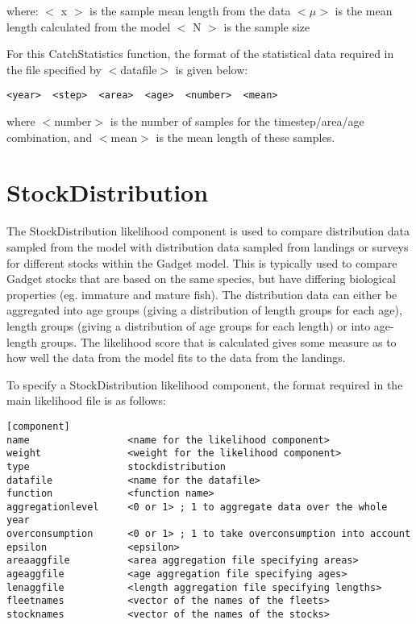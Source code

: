 \documentclass[10pt,twoside]{book}
\begin{document}
where:\newline
$<$ x $>$ is the sample mean length from the data\newline
$<\mu>$ is the mean length calculated from the model\newline
$<$ N $>$ is the sample size

\bigskip
For this CatchStatistics function, the format of the statistical data required in the file specified by $<$datafile$>$ is given below:

{\small\begin{verbatim}
<year>  <step>  <area>  <age>  <number>  <mean>
\end{verbatim}}

where $<$number$>$ is the number of samples for the timestep/area/age combination, and $<$mean$>$ is the mean length of these samples.

\section{StockDistribution}\label{sec:stockdist}
The StockDistribution likelihood component is used to compare distribution data sampled from the model with distribution data sampled from landings or surveys for different stocks within the Gadget model.  This is typically used to compare Gadget stocks that are based on the same species, but have differing biological properties (eg. immature and mature fish).  The distribution data can either be aggregated into age groups (giving a distribution of length groups for each age), length groups (giving a distribution of age groups for each length) or into age-length groups.  The likelihood score that is calculated gives some measure as to how well the data from the model fits to the data from the landings.

\bigskip
To specify a StockDistribution likelihood component, the format required in the main likelihood file is as follows:

{\small\begin{verbatim}
[component]
name                 <name for the likelihood component>
weight               <weight for the likelihood component>
type                 stockdistribution
datafile             <name for the datafile>
function             <function name>
aggregationlevel     <0 or 1> ; 1 to aggregate data over the whole year
overconsumption      <0 or 1> ; 1 to take overconsumption into account
epsilon              <epsilon>
areaaggfile          <area aggregation file specifying areas>
ageaggfile           <age aggregation file specifying ages>
lenaggfile           <length aggregation file specifying lengths>
fleetnames           <vector of the names of the fleets>
stocknames           <vector of the names of the stocks>
\end{verbatim}}
\end{document}
